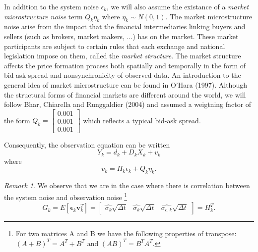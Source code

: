 \documentclass{article}
\theoremstyle{definition}
\theoremstyle{remark}
\newtheorem{remark}[thm]{Remark}
\newcommand{\m}[1]{\ensuremath{\mathbf{#1}}}
\begin{document}
In addition to the system noise $\epsilon_k$, we will also assume the existance of a \textit{market microstructure noise} term $Q_k\eta_k$ where $\eta_k \sim N(0,1)$. The market microstructure noise arise from the impact that the financial intermediaries linking buyers and sellers (such as brokers, market makers, ...) has on the market. These market participants are subject to certain rules that each exchange and national legislation impose on them, called the \textit{market structure}. The market structure affects the price formation process both spatially and temporally in the form of bid-ask spread and nonsynchronicity of observed data. An introduction to the general idea of market microstructure can be found in O'Hara (1997). Although the structural forms of financial markets are different around the world, we will follow Bhar, Chiarella and Runggaldier (2004) and assumed a weigtning factor of the form $Q_k = \begin{bmatrix} 0.001\\ 0.001\\ 0.001 \end{bmatrix}$ which reflects a typical bid-ask spread.

Consequently, the observation equation can be written
\begin{equation}\label{eq:driftobs}
\boxed{Y_k=d_k+D_kX_k+v_k}
\end{equation}
where
\begin{equation}
v_k=H_k\epsilon_k+Q_k\eta_k.
\end{equation}
\begin{remark}\label{rem:corrnoise}
We observe that we are in the case where there is correlation between the system noise and observation noise
\footnote{For two matrices A and B we have the following properties of transpose: $(A+B)^T=A^T+B^T$ and $(AB)^T=B^TA^T.$}
\begin{equation}
G_k=E[\m{\epsilon}_k\m{v}_k^T]=\begin{bmatrix} \hat{\sigma_k}\sqrt{\Delta t} & \hat{\sigma_k}\sqrt{\Delta t} & \hat{\sigma_{c,k}}\sqrt{\Delta t} \end{bmatrix}=H_k^T.
\end{equation}
\end{remark}
\end{document}
